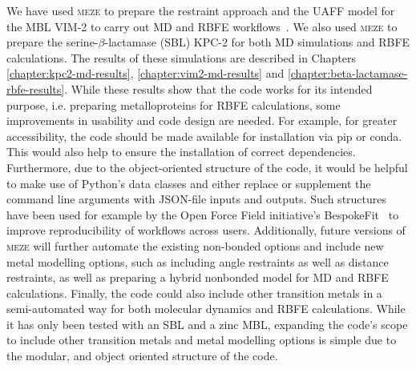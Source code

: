 We have used \textsc{meze} to prepare the restraint approach and the UAFF model for the MBL VIM-2 to carry out MD and RBFE workflows~\cite{guven_protocols_2024}. We also used \textsc{meze} to prepare the serine-$\beta$-lactamase (SBL) KPC-2 for both MD simulations and RBFE calculations. The results of these simulations are described in Chapters \ref{chapter:kpc2-md-results}, \ref{chapter:vim2-md-results} and \ref{chapter:beta-lactamase-rbfe-results}. While these results show that the code works for its intended purpose, i.e. preparing metalloproteins for RBFE calculations, some improvements in usability and code design are needed. For example, for greater accessibility, the code should be made available for installation via pip or conda. This would also help to ensure the installation of correct dependencies. Furthermore, due to the object-oriented structure of the code, it would be helpful to make use of Python's data classes and either replace or supplement the command line arguments with JSON-file inputs and outputs. Such structures have been used for example by the Open Force Field initiative's BespokeFit~\cite{horton_open_2022} to improve reproducibility of workflows across users. Additionally, future versions of \textsc{meze} will further automate the existing non-bonded options and include new metal modelling options, such as including angle restraints as well as distance restraints, as well as preparing a hybrid nonbonded model for MD and RBFE calculations. Finally, the code could also include other transition metals in a semi-automated way for both molecular dynamics and RBFE calculations. While it has only been tested with an SBL and a zinc MBL, expanding the code's scope to include other transition metals and metal modelling options is simple due to the modular, and object oriented structure of the code.